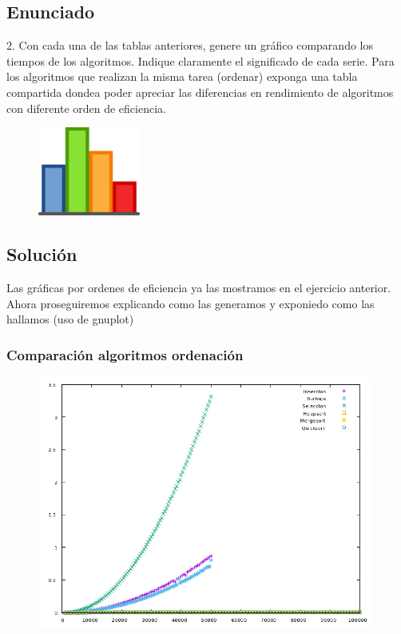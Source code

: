 \documentclass[compress]{beamer}
\begin{document}
\subsection{Enunciado}

\begin{frame}
	2. Con cada una de las tablas anteriores, genere un gráfico comparando los tiempos  de
los algoritmos. Indique claramente el significado de cada serie. Para los algoritmos que
realizan la misma tarea (ordenar) exponga una tabla compartida dondea poder apreciar las diferencias en rendimiento de algoritmos con diferente orden de
eficiencia.
	\begin{figure}
  \centering
    \includegraphics[width=0.3\textwidth]{graf.png}
  \label{fig:ejemplo}
\end{figure}
\end{frame}
\subsection{Solución}
\begin{frame}
Las gráficas por ordenes de eficiencia ya las mostramos en el ejercicio anterior. Ahora proseguiremos explicando como las generamos y exponiedo como las hallamos (uso de gnuplot)
\end{frame}
\begin{frame}
\frametitle{Comparación algoritmos ordenación}
	\begin{figure}
  \centering
    \includegraphics[width=0.98\textwidth]{Ordenacion.png}
  \label{fig:ejemplo}
\end{figure}
	
\end{frame}
\end{document}
